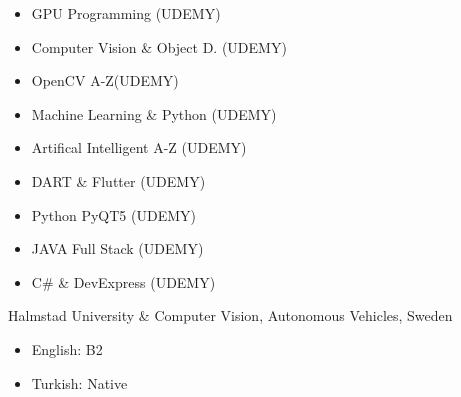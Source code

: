 
\smallskip
\divider
\smallskip


\smallskip

\smallskip

\begin{itemize}
    \item GPU Programming (UDEMY)
    \item Computer Vision \& Object D. (UDEMY)
    \item OpenCV A-Z(UDEMY)
    \item Machine Learning \& Python (UDEMY)
    \item Artifical Intelligent A-Z (UDEMY)
    \item DART \& Flutter (UDEMY)
    \item Python PyQT5 (UDEMY)
    \item JAVA Full Stack (UDEMY)
    \item C\# \& DevExpress (UDEMY)
\end{itemize}


{Halmstad University \& Computer Vision, Autonomous Vehicles, Sweden}

\smallskip

\begin{itemize}
    \item English: B2
    \item Turkish: Native
\end{itemize}

\smallskip
\smallskip
\smallskip
\smallskip
\smallskip
\smallskip
\smallskip
\smallskip
\smallskip
\smallskip
\smallskip
\smallskip
\smallskip
\smallskip
\smallskip
\smallskip
\smallskip
\smallskip
\smallskip
\smallskip
\smallskip
\smallskip
\smallskip
\smallskip
\smallskip
\smallskip
\smallskip
\smallskip
\smallskip
\smallskip
\smallskip
\smallskip
\smallskip
\smallskip
\smallskip
\smallskip
\smallskip
\smallskip
\smallskip
\smallskip
\smallskip
\smallskip
\smallskip
\smallskip
\smallskip
\smallskip









